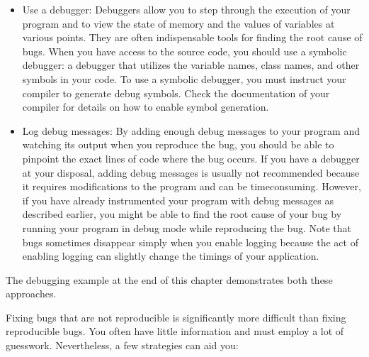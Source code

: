 \begin{itemize}
\item
Use a debugger: Debuggers allow you to step through the execution of your program and to view the state of memory and the values of variables at various points. They are often indispensable tools for finding the root cause of bugs. When you have access to the source code, you should use a symbolic debugger: a debugger that utilizes the variable names, class names, and other symbols in your code. To use a symbolic debugger, you must instruct your compiler to generate debug symbols. Check the documentation of your compiler for details on how to enable symbol generation.

\item
Log debug messages: By adding enough debug messages to your program and watching its output when you reproduce the bug, you should be able to pinpoint the exact lines of code where the bug occurs. If you have a debugger at your disposal, adding debug messages is usually not recommended because it requires modifications to the program and can be timeconsuming. However, if you have already instrumented your program with debug messages as described earlier, you might be able to find the root cause of your bug by running your program in debug mode while reproducing the bug. Note that bugs sometimes disappear simply when you enable logging because the act of enabling logging can slightly change the timings of your application.
\end{itemize}

The debugging example at the end of this chapter demonstrates both these approaches.


Fixing bugs that are not reproducible is significantly more difficult than fixing reproducible bugs. You often have little information and must employ a lot of guesswork. Nevertheless, a few strategies can aid you:

